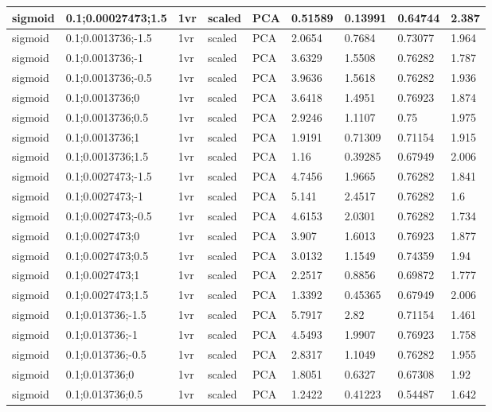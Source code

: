 \begin{longtable}{lllllllll}
sigmoid & 0.1;0.00027473;1.5 & 1vr & scaled & PCA & 0.51589 & 0.13991 & 0.64744 & 2.387\\ \hline
sigmoid & 0.1;0.0013736;-1.5 & 1vr & scaled & PCA & 2.0654 & 0.7684 & 0.73077 & 1.964\\ \hline
sigmoid & 0.1;0.0013736;-1 & 1vr & scaled & PCA & 3.6329 & 1.5508 & 0.76282 & 1.787\\ \hline
sigmoid & 0.1;0.0013736;-0.5 & 1vr & scaled & PCA & 3.9636 & 1.5618 & 0.76282 & 1.936\\ \hline
sigmoid & 0.1;0.0013736;0 & 1vr & scaled & PCA & 3.6418 & 1.4951 & 0.76923 & 1.874\\ \hline
sigmoid & 0.1;0.0013736;0.5 & 1vr & scaled & PCA & 2.9246 & 1.1107 & 0.75 & 1.975\\ \hline
sigmoid & 0.1;0.0013736;1 & 1vr & scaled & PCA & 1.9191 & 0.71309 & 0.71154 & 1.915\\ \hline
sigmoid & 0.1;0.0013736;1.5 & 1vr & scaled & PCA & 1.16 & 0.39285 & 0.67949 & 2.006\\ \hline
sigmoid & 0.1;0.0027473;-1.5 & 1vr & scaled & PCA & 4.7456 & 1.9665 & 0.76282 & 1.841\\ \hline
sigmoid & 0.1;0.0027473;-1 & 1vr & scaled & PCA & 5.141 & 2.4517 & 0.76282 & 1.6\\ \hline
sigmoid & 0.1;0.0027473;-0.5 & 1vr & scaled & PCA & 4.6153 & 2.0301 & 0.76282 & 1.734\\ \hline
sigmoid & 0.1;0.0027473;0 & 1vr & scaled & PCA & 3.907 & 1.6013 & 0.76923 & 1.877\\ \hline
sigmoid & 0.1;0.0027473;0.5 & 1vr & scaled & PCA & 3.0132 & 1.1549 & 0.74359 & 1.94\\ \hline
sigmoid & 0.1;0.0027473;1 & 1vr & scaled & PCA & 2.2517 & 0.8856 & 0.69872 & 1.777\\ \hline
sigmoid & 0.1;0.0027473;1.5 & 1vr & scaled & PCA & 1.3392 & 0.45365 & 0.67949 & 2.006\\ \hline
sigmoid & 0.1;0.013736;-1.5 & 1vr & scaled & PCA & 5.7917 & 2.82 & 0.71154 & 1.461\\ \hline
sigmoid & 0.1;0.013736;-1 & 1vr & scaled & PCA & 4.5493 & 1.9907 & 0.76923 & 1.758\\ \hline
sigmoid & 0.1;0.013736;-0.5 & 1vr & scaled & PCA & 2.8317 & 1.1049 & 0.76282 & 1.955\\ \hline
sigmoid & 0.1;0.013736;0 & 1vr & scaled & PCA & 1.8051 & 0.6327 & 0.67308 & 1.92\\ \hline
sigmoid & 0.1;0.013736;0.5 & 1vr & scaled & PCA & 1.2422 & 0.41223 & 0.54487 & 1.642\\ \hline

\end{longtable}
